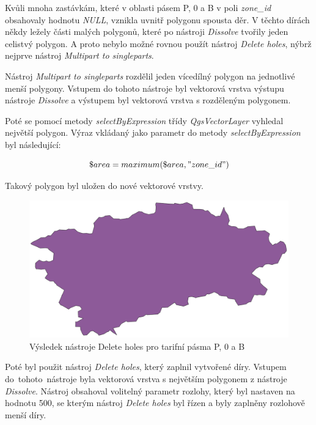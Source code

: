 Kvůli mnoha zastávkám, které v oblasti pásem P, 0 a B v poli \textit{zone\_id} obsahovaly hodnotu \textit{NULL},
vznikla uvnitř polygonu spousta děr. V těchto dírách někdy ležely části malých polygonů, které 
po nástroji \textit{Dissolve} tvořily jeden celistvý polygon. A proto nebylo možné rovnou použít nástroj \textit{Delete holes},
nýbrž nejprve nástroj \textit{Multipart to singleparts}.

Nástroj \textit{Multipart to singleparts} rozdělil jeden vícedílný polygon na jednotlivé menší polygony. Vstupem do tohoto
nástroje byl vektorová vrstva výstupu nástroje \textit{Dissolve} a výstupem byl vektorová vrstva s rozděleným polygonem.

Poté se pomocí metody \textit{selectByExpression} třídy \textit{QgsVectorLayer} vyhledal nej\-větší polygon.
Výraz vkládaný jako parametr do metody \textit{selectByExpression} byl následující:

\[\$area = maximum(\$area, "zone\_id")\]

Takový polygon byl uložen do nové vektorové vrstvy. 

\begin{figure}[H] \centering
    \includegraphics[width=400pt]{./pictures/without-holes-P0B.png}
    \caption[Výsledek nástroje Delete holes pro tarifní pásma P, 0 a B]{Výsledek nástroje Delete holes pro tarifní pásma P, 0 a B}
	\label{fig:without-holes-P0B}              
\end{figure} 

Poté byl použit nástroj \textit{Delete holes}, který zaplnil vytvořené díry. Vstupem do~tohoto~nástroje byla vektorová
vrstva s největším polygonem z nástroje \textit{Dissolve}. Nástroj obsahoval volitelný parametr rozlohy, který byl
nastaven na hodnotu 500, se kterým nástroj \textit{Delete holes} byl řízen a byly zaplněny rozlohově menší díry.  


